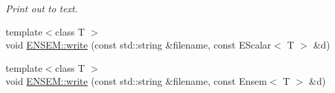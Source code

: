 \begin{DoxyCompactItemize}
\begin{DoxyCompactList}\small\item\em Print out to text. \end{DoxyCompactList}\item 
{\footnotesize template$<$class T $>$ }\\void \mbox{\hyperlink{namespaceENSEM_a5360eb9dd0dfcdb3fcf8f085117ddf8a}{E\+N\+S\+E\+M\+::write}} (const std\+::string \&filename, const E\+Scalar$<$ T $>$ \&d)
\item 
{\footnotesize template$<$class T $>$ }\\void \mbox{\hyperlink{namespaceENSEM_a2159da8c0a7ad6eec6b0d7179f0251e8}{E\+N\+S\+E\+M\+::write}} (const std\+::string \&filename, const Ensem$<$ T $>$ \&d)
\end{DoxyCompactItemize}
